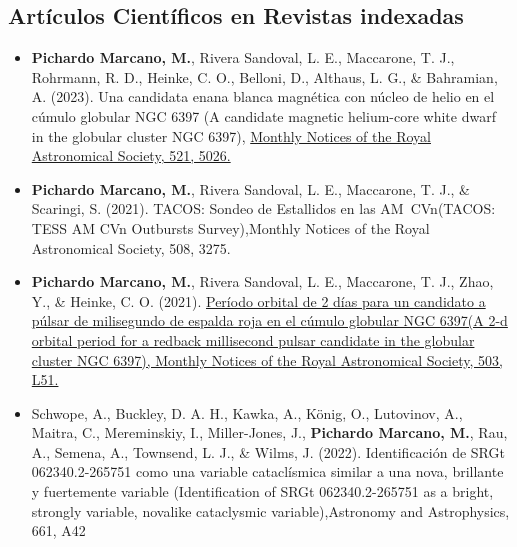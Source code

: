 \documentclass[letterpaper,10pt]{article}
\begin{document}
\subsection*{Art\'iculos Cient\'ificos en Revistas indexadas }
\begin{itemize}[label=$\blacktriangleright$]


                \item \textbf{Pichardo Marcano, M.}, Rivera Sandoval, L. E., Maccarone, T. J., Rohrmann, R. D., Heinke, C. O., Belloni, D., Althaus, L. G., \& Bahramian, A. (2023). Una candidata enana blanca magn\'etica con n\'ucleo de helio en el c\'umulo globular NGC 6397 (A candidate magnetic helium-core white dwarf in the globular cluster NGC 6397), \href{https://ui.adsabs.harvard.edu/abs/2023MNRAS.521.5026P/abstract}{Monthly Notices of the Royal Astronomical Society, 521, 5026.}





        
        \item \textbf{Pichardo Marcano, M.}, Rivera Sandoval, L. E., Maccarone, T. J., \& Scaringi, S. (2021). TACOS: Sondeo de Estallidos en las AM~CVn(TACOS: TESS AM CVn Outbursts Survey),Monthly Notices of the Royal Astronomical Society, 508, 3275.


        
                
            \item \textbf{Pichardo Marcano, M.}, Rivera Sandoval, L. E., Maccarone, T. J., Zhao, Y., \& Heinke, C. O. (2021). \href{https://ui.adsabs.harvard.edu/abs/2021MNRAS.503L..51P/abstract}{Per\'iodo orbital de 2 d\'ias para un candidato a p\'ulsar de milisegundo de espalda roja en el c\'umulo globular NGC 6397(A 2-d orbital period for a redback millisecond pulsar candidate in the globular cluster NGC 6397), Monthly Notices of the Royal Astronomical Society, 503, L51.}
        
        
        \item Schwope, A., Buckley, D. A. H., Kawka, A., König, O., Lutovinov, A., Maitra, C., Mereminskiy, I., Miller-Jones, J., \textbf{Pichardo Marcano, M.}, Rau, A., Semena, A., Townsend, L. J., \& Wilms, J. (2022). Identificaci\'on de SRGt 062340.2-265751 como una variable catacl\'ismica similar a una nova, brillante y fuertemente variable (Identification of SRGt 062340.2-265751 as a bright, strongly variable, novalike cataclysmic variable),Astronomy and Astrophysics, 661, A42
        

\end{itemize}
\end{document}

